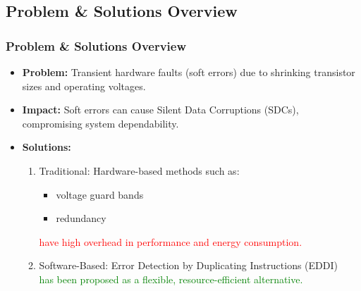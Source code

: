 \documentclass[
	12pt, %
]{beamer}
\begin{document}
\subsection{Problem \& Solutions Overview}
\begin{frame}
	\frametitle{Problem \& Solutions Overview}
	
	\begin{itemize}
		\item \textbf{Problem:}
		Transient hardware faults (soft errors) due to shrinking transistor sizes and operating voltages.
		
		\item \textbf{Impact:}
		Soft errors can cause Silent Data Corruptions (SDCs), compromising system dependability.
		
		\item \textbf{Solutions:}
		\begin{enumerate}
			\item Traditional: Hardware-based methods such as:
			\begin{itemize}
				\item voltage guard bands
				\item redundancy
			\end{itemize}
			\textcolor{red}{have high overhead in performance and energy consumption.}
			
			\item Software-Based: Error Detection by Duplicating Instructions (EDDI)\\
			\textcolor{Green}{has been proposed as a flexible, resource-efficient alternative.}
		\end{enumerate}
	\end{itemize}
\end{frame}

\end{document}
